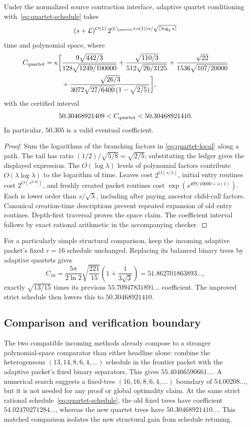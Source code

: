 \begin{theorem}
\label{thm:quartet-final}
Under the normalized source contraction interface, adaptive quartet
conditioning with~\eqref{eq:quartet-schedule} takes
\[
 (s+\mathcal L)^{O(1)}\,
 2^{(C_{\rm quartet}+o(1))s/\sqrt{\lceil\log_2s\rceil}}
\]
time and polynomial space, where
\begin{align*}
 C_{\rm quartet}=\kappa\bigg[&
 \frac{9\sqrt{442/3}}{128\sqrt{1249/100000}}
 +\frac{\sqrt{110/3}}{512\sqrt{26/3125}}
 +\frac{\sqrt{22}}{1536\sqrt{107/20000}}\\
 &+\frac{\sqrt{26/3}}
 {3072\sqrt{27/6400}\,(1-\sqrt{2/5})}\bigg],
\end{align*}
with the certified interval
\[
 50.30468921409<C_{\rm quartet}<50.30468921410.
\]
In particular, $50.305$ is a valid eventual coefficient.
\end{theorem}
\begin{proof}
Sum the logarithms of the branching factors in
\eqref{eq:quartet-local} along a path. The tail has ratio
$(1/2)/\sqrt{5/8}=\sqrt{2/5}$; substituting the ledger gives the
displayed expression. The $O(\log\lambda)$ levels of polynomial
factors contribute $O(\lambda\log\lambda)$ to the logarithm of time.
Leaves cost $2^{O(s/\lambda)}$, initial entry routines cost
$2^{O(s^{9/10})}$, and freshly created packet routines cost
$\exp(s^{499/10000+o(1)})$. Each is lower order than
$s/\sqrt\lambda$, including after paying ancestor child-call factors.
Canonical creation-time descriptions prevent repeated expansion of old
entry routines. Depth-first traversal proves the space claim. The
coefficient interval follows by exact rational arithmetic in the
accompanying checker.
\end{proof}

For a particularly simple structural comparison, keep the incoming
adaptive packet's fixed $r=16$ schedule unchanged. Replacing its balanced
binary trees by adaptive quartets gives
\[
 C_{16}=\frac{5\pi}{2\ln2}\sqrt{\frac{221}{15}}
 \left(1+\frac1{3\sqrt3}\right)
 =51.862701863893\ldots,
\]
exactly $\sqrt{13/15}$ times its previous $55.70947831891\ldots$
coefficient. The improved strict schedule then lowers this to
$50.30468921410$.

\subsection{Comparison and verification boundary}

The two compatible incoming methods already compose to a stronger
polynomial-space comparator than either headline alone: combine the
heterogeneous $(13,14,8,6,4,\ldots)$ schedule in the frontier packet with
the adaptive packet's fixed binary separators. This gives
$55.40466590661\ldots$. A numerical search suggests a fixed-tree
$(16,16,8,6,4,\ldots)$ boundary of $54.00208\ldots$, but it is not
needed for any proof or global optimality claim. At the same strict
rational schedule~\eqref{eq:quartet-schedule}, the old fixed trees have
coefficient $54.02470271284\ldots$, whereas the new quartet trees have
$50.30468921410\ldots$. This matched comparison isolates the new
structural gain from schedule retuning.

